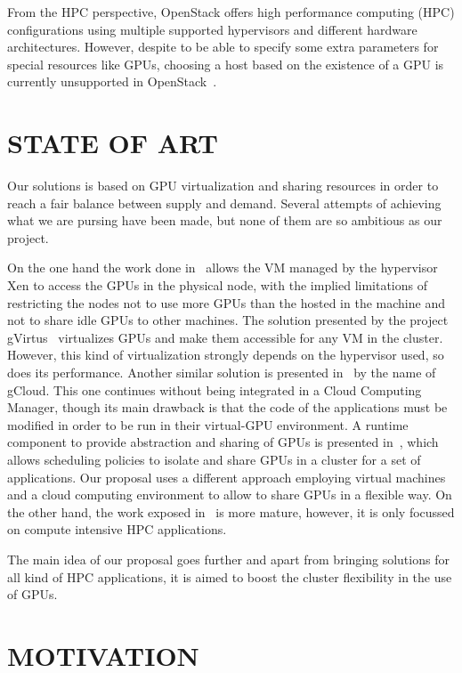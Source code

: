 \documentclass[a4paper,twoside]{article}
\begin{document}
From the HPC perspective, OpenStack offers high performance computing (HPC) configurations using
multiple supported hypervisors and different hardware architectures. However, despite to be able to
specify some extra parameters for special resources like GPUs, choosing a host based on the existence
of a GPU is currently unsupported in OpenStack~\cite{OpenStackGPU}. 

\section{\uppercase{State of Art}}
\label{sec:state}
Our solutions is based on GPU virtualization and sharing resources in order
to reach a fair balance between supply and demand. 
Several attempts of achieving what we are pursing have been
made, but none of them are so ambitious as our project. 

On
the one hand the work done in~\cite{younge2013enabling} allows the VM managed
by the hypervisor Xen to access the GPUs in the physical
node, with the implied limitations of restricting the nodes not
to use more GPUs than the hosted in the machine and not
to share idle GPUs to other machines. The solution presented 
by the project gVirtus~\cite{giunta2010gpgpu} virtualizes GPUs and make
them accessible for any VM in the cluster. However, this kind
of virtualization strongly depends on the hypervisor used, so
does its performance. Another similar solution is presented in~\cite{diab2013dynamic} by the name of gCloud. 
This one continues without being integrated in a Cloud Computing Manager, though its main
drawback is that the code of the applications must be modified
in order to be run in their virtual-GPU environment. A runtime component to provide abstraction
and sharing of GPUs is presented in~\cite{becchi2012virtual}, which allows scheduling policies 
to isolate and share GPUs in a cluster for a set of applications. Our proposal uses a different 
approach employing virtual machines and a cloud computing environment to allow to share GPUs in a flexible way.
On the other hand, the work exposed in~\cite{jungpgpu} is more mature, however,
it is only focussed on compute intensive HPC applications. 

The main idea of our proposal goes further and apart from
bringing solutions for all kind of HPC applications, it is aimed
to boost the cluster flexibility in the use of GPUs.

\section{\uppercase{Motivation}}
\label{sec:motivation}
\end{document}
